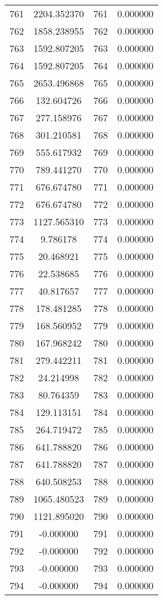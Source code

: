 \documentclass[12pt]{article}
\begin{document}
\begin{longtable}{@{}cccc@{}}
761 & 2204.352370 & 761 & 0.000000 \\
762 & 1858.238955 & 762 & 0.000000 \\
763 & 1592.807205 & 763 & 0.000000 \\
764 & 1592.807205 & 764 & 0.000000 \\
765 & 2653.496868 & 765 & 0.000000 \\
766 & 132.604726 & 766 & 0.000000 \\
767 & 277.158976 & 767 & 0.000000 \\
768 & 301.210581 & 768 & 0.000000 \\
769 & 555.617932 & 769 & 0.000000 \\
770 & 789.441270 & 770 & 0.000000 \\
771 & 676.674780 & 771 & 0.000000 \\
772 & 676.674780 & 772 & 0.000000 \\
773 & 1127.565310 & 773 & 0.000000 \\
774 & 9.786178 & 774 & 0.000000 \\
775 & 20.468921 & 775 & 0.000000 \\
776 & 22.538685 & 776 & 0.000000 \\
777 & 40.817657 & 777 & 0.000000 \\
778 & 178.481285 & 778 & 0.000000 \\
779 & 168.560952 & 779 & 0.000000 \\
780 & 167.968242 & 780 & 0.000000 \\
781 & 279.442211 & 781 & 0.000000 \\
782 & 24.214998 & 782 & 0.000000 \\
783 & 80.764359 & 783 & 0.000000 \\
784 & 129.113151 & 784 & 0.000000 \\
785 & 264.719472 & 785 & 0.000000 \\
786 & 641.788820 & 786 & 0.000000 \\
787 & 641.788820 & 787 & 0.000000 \\
788 & 640.508253 & 788 & 0.000000 \\
789 & 1065.480523 & 789 & 0.000000 \\
790 & 1121.895020 & 790 & 0.000000 \\
791 & -0.000000 & 791 & 0.000000 \\
792 & -0.000000 & 792 & 0.000000 \\
793 & -0.000000 & 793 & 0.000000 \\
794 & -0.000000 & 794 & 0.000000 \\

\end{longtable}
\end{document}
